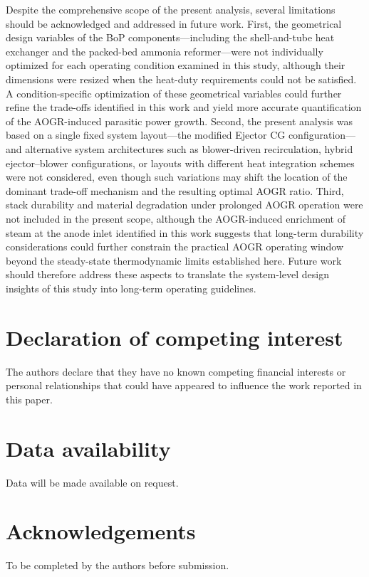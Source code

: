 \documentclass[a4paper,10pt]{cas-dc} %
\begin{document}
Despite the comprehensive scope of the present analysis, several limitations should be acknowledged and addressed in future work.
First, the geometrical design variables of the BoP components---including the shell-and-tube heat exchanger and the packed-bed ammonia reformer---were not individually optimized for each operating condition examined in this study, although their dimensions were resized when the heat-duty requirements could not be satisfied.
A condition-specific optimization of these geometrical variables could further refine the trade-offs identified in this work and yield more accurate quantification of the AOGR-induced parasitic power growth.
Second, the present analysis was based on a single fixed system layout---the modified Ejector CG configuration---and alternative system architectures such as blower-driven recirculation, hybrid ejector--blower configurations, or layouts with different heat integration schemes were not considered, even though such variations may shift the location of the dominant trade-off mechanism and the resulting optimal AOGR ratio.
Third, stack durability and material degradation under prolonged AOGR operation were not included in the present scope, although the AOGR-induced enrichment of steam at the anode inlet identified in this work suggests that long-term durability considerations could further constrain the practical AOGR operating window beyond the steady-state thermodynamic limits established here.
Future work should therefore address these aspects to translate the system-level design insights of this study into long-term operating guidelines.

\section*{Declaration of competing interest}
The authors declare that they have no known competing financial interests or personal relationships that could have appeared to influence the work reported in this paper.

\section*{Data availability}
Data will be made available on request.

\section*{Acknowledgements}
To be completed by the authors before submission.
\end{document}
